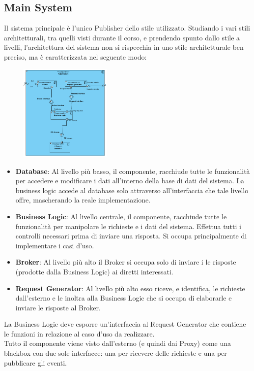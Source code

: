 \subsection{Main System}
Il sistema principale è l'unico Publisher dello stile utilizzato. Studiando i vari stili architetturali, tra quelli visti durante il corso, e prendendo spunto dallo stile a livelli, l'architettura del sistema non si rispecchia in uno stile architetturale ben preciso, ma è caratterizzata nel seguente modo:
\begin{figure}[H]
	\centering
	\includegraphics[width=0.4\textwidth]{Immagini/main_system.png}
\end{figure}
\begin{itemize}
	\item \textbf{Database}: Al livello più basso, il componente, racchiude tutte le funzionalità per accedere e modificare i dati all'interno della base di dati del sistema. La business logic accede al database solo attraverso all'interfaccia che tale livello offre, mascherando la reale implementazione.
	\item \textbf{Business Logic}: Al livello centrale, il componente, racchiude tutte le funzionalità per manipolare le richieste e i dati del sistema. Effettua tutti i controlli necessari prima di inviare una risposta. Si occupa principalmente di implementare i casi d'uso.
	\item \textbf{Broker}: Al livello più alto il Broker si occupa solo di inviare i le risposte (prodotte dalla Business Logic) ai diretti interessati. 
	\item \textbf{Request Generator}: Al livello più alto esso riceve, e identifica, le richieste dall'esterno e le inoltra alla Business Logic che si occupa di elaborarle e inviare le risposte al Broker.
\end{itemize}
La Business Logic deve esporre un'interfaccia al Request Generator che contiene le funzioni in relazione al caso d'uso da realizzare.
\\Tutto il componente viene visto dall'esterno (e quindi dai Proxy) come una blackbox con due sole interfacce: una per ricevere delle richieste e una per pubblicare gli eventi.

